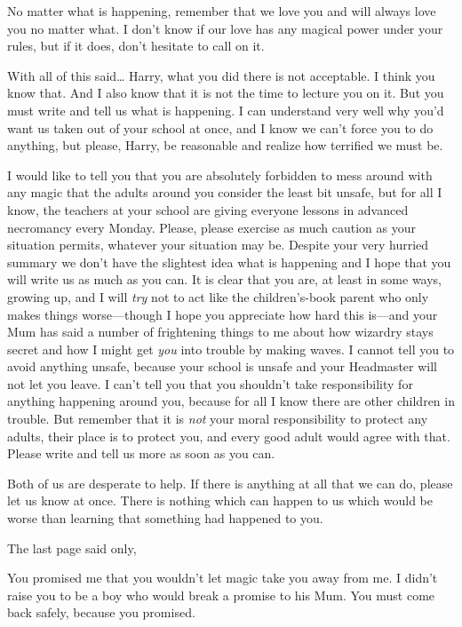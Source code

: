 \begin{writtenNote}
No matter what is happening, remember that we love you and will always love you no matter what. I don't know if our love has any magical power under your rules, but if it does, don't hesitate to call on it.

With all of this said{\ldots} Harry, what you did there is not acceptable. I think you know that. And I also know that it is not the time to lecture you on it. But you must write and tell us what is happening. I can understand very well why you'd want us taken out of your school at once, and I know we can't force you to do anything, but please, Harry, be reasonable and realize how terrified we must be.

I would like to tell you that you are absolutely forbidden to mess around with any magic that the adults around you consider the least bit unsafe, but for all I know, the teachers at your school are giving everyone lessons in advanced necromancy every Monday. Please, please exercise as much caution as your situation permits, whatever your situation may be. Despite your very hurried summary we don't have the slightest idea what is happening and I hope that you will write us as much as you can. It is clear that you are, at least in some ways, growing up, and I will \emph{try} not to act like the children's-book parent who only makes things worse—though I hope you appreciate how hard this is—and your Mum has said a number of frightening things to me about how wizardry stays secret and how I might get \emph{you} into trouble by making waves. I cannot tell you to avoid anything unsafe, because your school is unsafe and your Headmaster will not let you leave. I can't tell you that you shouldn't take responsibility for anything happening around you, because for all I know there are other children in trouble. But remember that it is \emph{not} your moral responsibility to protect any adults, their place is to protect you, and every good adult would agree with that. Please write and tell us more as soon as you can.

Both of us are desperate to help. If there is anything at all that we can do, please let us know at once. There is nothing which can happen to us which would be worse than learning that something had happened to you.

\end{writtenNote}

The last page said only,

\begin{writtenNote}
You promised me that you wouldn't let magic take you away from me. I didn't raise you to be a boy who would break a promise to his Mum. You must come back safely, because you promised.

\end{writtenNote}


